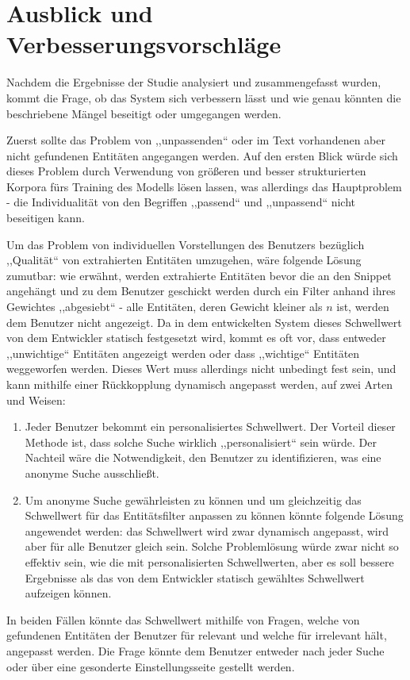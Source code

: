 \section{Ausblick und Verbesserungsvorschläge}
Nachdem die Ergebnisse der Studie analysiert und zusammengefasst wurden, kommt die Frage, ob das System sich verbessern lässt und wie genau könnten die beschriebene Mängel beseitigt oder umgegangen werden.

Zuerst sollte das Problem von ,,unpassenden`` oder im Text vorhandenen aber nicht gefundenen Entitäten angegangen werden. Auf den ersten Blick würde sich dieses Problem durch Verwendung von größeren und besser strukturierten Korpora fürs Training des Modells lösen lassen, was allerdings das Hauptproblem - die Individualität von den Begriffen ,,passend`` und ,,unpassend`` nicht beseitigen kann.

Um das Problem von individuellen Vorstellungen des Benutzers bezüglich ,,Qualität`` von extrahierten Entitäten umzugehen, wäre folgende Lösung zumutbar: wie erwähnt, werden extrahierte Entitäten bevor die an den Snippet angehängt und zu dem Benutzer geschickt werden durch ein Filter anhand ihres Gewichtes ,,abgesiebt`` - alle Entitäten, deren Gewicht kleiner als $n$ ist, werden dem Benutzer nicht angezeigt. Da in dem entwickelten System dieses Schwellwert von dem Entwickler statisch festgesetzt wird, kommt es oft vor, dass entweder ,,unwichtige`` Entitäten angezeigt werden oder dass ,,wichtige`` Entitäten weggeworfen werden. Dieses Wert muss allerdings nicht unbedingt fest sein, und kann mithilfe einer Rückkopplung dynamisch angepasst werden, auf zwei Arten und Weisen:
\begin{enumerate}
\item Jeder Benutzer bekommt ein personalisiertes Schwellwert. Der Vorteil dieser Methode ist, dass solche Suche wirklich ,,personalisiert`` sein würde. Der Nachteil wäre die Notwendigkeit, den Benutzer zu identifizieren, was eine anonyme Suche ausschließt. 
\item Um anonyme Suche gewährleisten zu können und um gleichzeitig das Schwellwert für das Entitätsfilter anpassen zu können könnte folgende Lösung angewendet werden: das Schwellwert wird zwar dynamisch angepasst, wird aber für alle Benutzer gleich sein. Solche Problemlösung würde zwar nicht so effektiv sein, wie die mit personalisierten Schwellwerten, aber es soll bessere Ergebnisse als das von dem Entwickler statisch gewähltes Schwellwert aufzeigen können.
\end{enumerate}
In beiden Fällen könnte das Schwellwert mithilfe von Fragen, welche von gefundenen Entitäten der Benutzer für relevant und welche für irrelevant hält, angepasst werden. Die Frage könnte dem Benutzer entweder nach jeder Suche oder über eine gesonderte Einstellungsseite gestellt werden.

